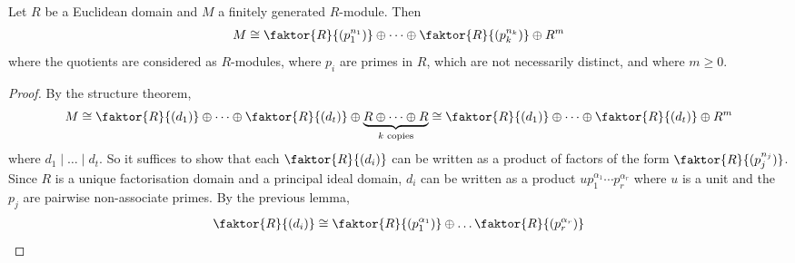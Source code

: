 \begin{lemma}
	Let $R$ be a Euclidean domain and $M$ a finitely generated $R$-module.
	Then
	\begin{align*}
		M \cong \faktor{R}{(p_1^{n_1})} \oplus \dots \oplus \faktor{R}{(p_k^{n_k})} \oplus R^m
	\end{align*}
	where the quotients are considered as $R$-modules, where $p_i$ are primes in $R$, which are not necessarily distinct, and where $m \geq 0$.
\end{lemma}
\begin{proof}
	By the structure theorem,
	\begin{align*}
		M \cong \faktor{R}{(d_1)} \oplus \dots \oplus \faktor{R}{(d_t)} \oplus \underbrace{R \oplus \dots \oplus R}_{k \text{ copies}} \cong \faktor{R}{(d_1)} \oplus \dots \oplus \faktor{R}{(d_t)} \oplus R^m
	\end{align*}
	where $d_1 \mid \dots \mid d_t$.
	So it suffices to show that each $\faktor{R}{(d_i)}$ can be written as a product of factors of the form $\faktor{R}{(p_j^{n_j})}$.
	Since $R$ is a unique factorisation domain and a principal ideal domain, $d_i$ can be written as a product $u p_1^{\alpha_1} \cdots p_r^{\alpha_r}$ where $u$ is a unit and the $p_j$ are pairwise non-associate primes.
	By the previous lemma,
	\begin{align*}
		\faktor{R}{(d_i)} \cong \faktor{R}{(p_1^{\alpha_1})} \oplus \dots \faktor{R}{(p_r^{\alpha_r})}
	\end{align*}
\end{proof}

